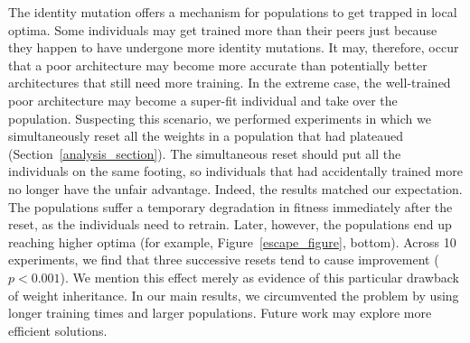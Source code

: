 \documentclass{article}
\begin{document}
The identity mutation offers a mechanism for populations to get trapped in local optima. Some individuals may get trained more than their peers just because they happen to have undergone more identity mutations. It may, therefore, occur that a poor architecture may become more accurate than potentially better architectures that still need more training. In the extreme case, the well-trained poor architecture may become a super-fit individual and take over the population. Suspecting this scenario, we performed experiments in which we simultaneously reset all the weights in a population that had plateaued (Section~\ref{analysis_section}). The simultaneous reset should put all the individuals on the same footing, so individuals that had accidentally trained more no longer have the unfair advantage. Indeed, the results matched our expectation. The populations suffer a temporary degradation in fitness immediately after the reset, as the individuals need to retrain. Later, however, the populations end up reaching higher optima (for example, Figure~\ref{escape_figure}, bottom). Across 10 experiments, we find that three successive resets tend to cause improvement ($p < 0.001$). We mention this effect merely as evidence of this particular drawback of weight inheritance. In our main results, we circumvented the problem by using longer training times and larger populations. Future work may explore more efficient solutions.
\end{document}
